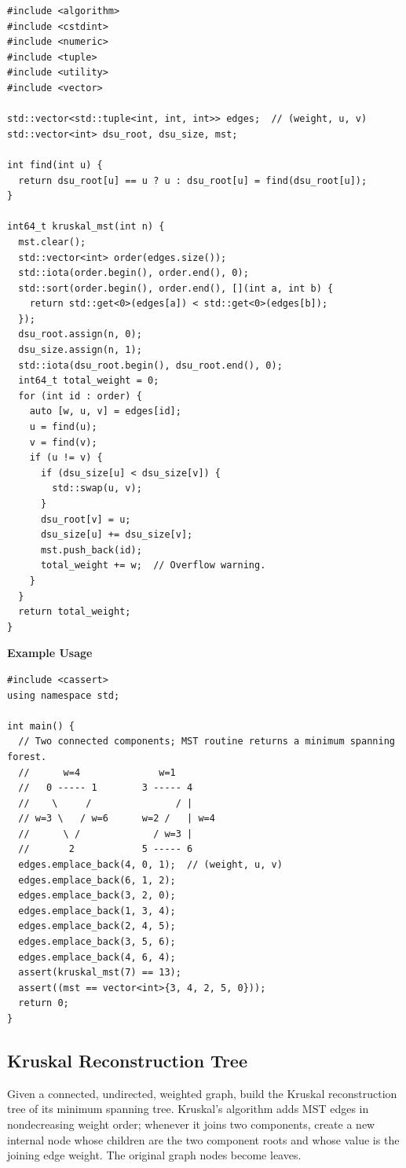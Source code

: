 \begin{lstlisting}[style=cpp]
#include <algorithm>
#include <cstdint>
#include <numeric>
#include <tuple>
#include <utility>
#include <vector>

std::vector<std::tuple<int, int, int>> edges;  // (weight, u, v)
std::vector<int> dsu_root, dsu_size, mst;

int find(int u) {
  return dsu_root[u] == u ? u : dsu_root[u] = find(dsu_root[u]);
}

int64_t kruskal_mst(int n) {
  mst.clear();
  std::vector<int> order(edges.size());
  std::iota(order.begin(), order.end(), 0);
  std::sort(order.begin(), order.end(), [](int a, int b) {
    return std::get<0>(edges[a]) < std::get<0>(edges[b]);
  });
  dsu_root.assign(n, 0);
  dsu_size.assign(n, 1);
  std::iota(dsu_root.begin(), dsu_root.end(), 0);
  int64_t total_weight = 0;
  for (int id : order) {
    auto [w, u, v] = edges[id];
    u = find(u);
    v = find(v);
    if (u != v) {
      if (dsu_size[u] < dsu_size[v]) {
        std::swap(u, v);
      }
      dsu_root[v] = u;
      dsu_size[u] += dsu_size[v];
      mst.push_back(id);
      total_weight += w;  // Overflow warning.
    }
  }
  return total_weight;
}
\end{lstlisting}
\textbf{Example Usage}\par
\begin{lstlisting}[style=cpp]
#include <cassert>
using namespace std;

int main() {
  // Two connected components; MST routine returns a minimum spanning forest.
  //      w=4              w=1
  //   0 ----- 1        3 ----- 4
  //    \     /               / |
  // w=3 \   / w=6      w=2 /   | w=4
  //      \ /             / w=3 |
  //       2            5 ----- 6
  edges.emplace_back(4, 0, 1);  // (weight, u, v)
  edges.emplace_back(6, 1, 2);
  edges.emplace_back(3, 2, 0);
  edges.emplace_back(1, 3, 4);
  edges.emplace_back(2, 4, 5);
  edges.emplace_back(3, 5, 6);
  edges.emplace_back(4, 6, 4);
  assert(kruskal_mst(7) == 13);
  assert((mst == vector<int>{3, 4, 2, 5, 0}));
  return 0;
}
\end{lstlisting}
\subsection{Kruskal Reconstruction Tree}
\label{sec:4.4.3}
Given a connected, undirected, weighted graph, build the Kruskal reconstruction tree of its minimum spanning tree. Kruskal's algorithm adds MST edges in nondecreasing weight order; whenever it joins two components, create a new internal node whose children are the two component roots and whose value is the joining edge weight. The original graph nodes become leaves.

